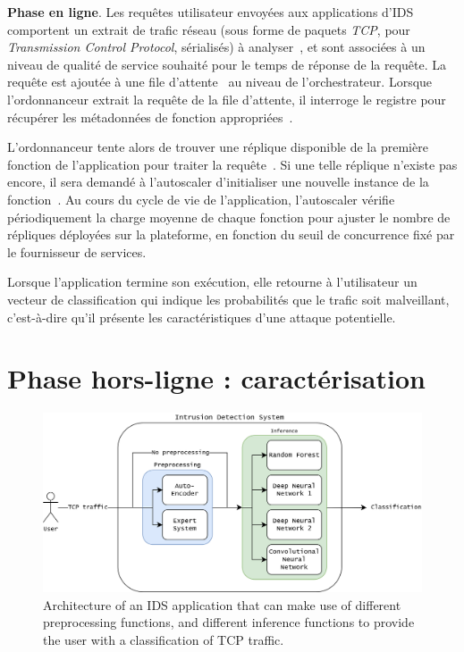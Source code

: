 \textbf{Phase en ligne}. Les requêtes utilisateur envoyées aux applications d'IDS comportent un extrait de trafic réseau (sous forme de paquets \textit{TCP}, pour \textit{Transmission Control Protocol}, sérialisés) à analyser~, et sont associées à un niveau de qualité de service souhaité pour le temps de réponse de la requête. La requête est ajoutée à une file d'attente~ au niveau de l'orchestrateur. Lorsque l'ordonnanceur extrait la requête de la file d'attente, il interroge le registre pour récupérer les métadonnées de fonction appropriées~.

L'ordonnanceur tente alors de trouver une réplique disponible de la première fonction de l'application pour traiter la requête~. Si une telle réplique n'existe pas encore, il sera demandé à l'autoscaler d'initialiser une nouvelle instance de la fonction~. Au cours du cycle de vie de l'application, l'autoscaler vérifie périodiquement la charge moyenne de chaque fonction pour ajuster le nombre de répliques déployées sur la plateforme, en fonction du seuil de concurrence fixé par le fournisseur de services.

Lorsque l'application termine son exécution, elle retourne à l'utilisateur un vecteur de classification qui indique les probabilités que le trafic soit malveillant, c'est-à-dire qu'il présente les caractéristiques d'une attaque potentielle.

\section{Phase hors-ligne : caractérisation} 
\label{section:herocache-workload}

\begin{figure}[!ht]
    \centering
    \includegraphics[width=0.8\columnwidth]{5_Chapitre5/figures/ids-application.png}
    \caption{Architecture of an IDS application that can make use of different preprocessing functions, and different inference functions to provide the user with a classification of TCP traffic.}
    \label{figure:herocache-ids-application}
\end{figure}

